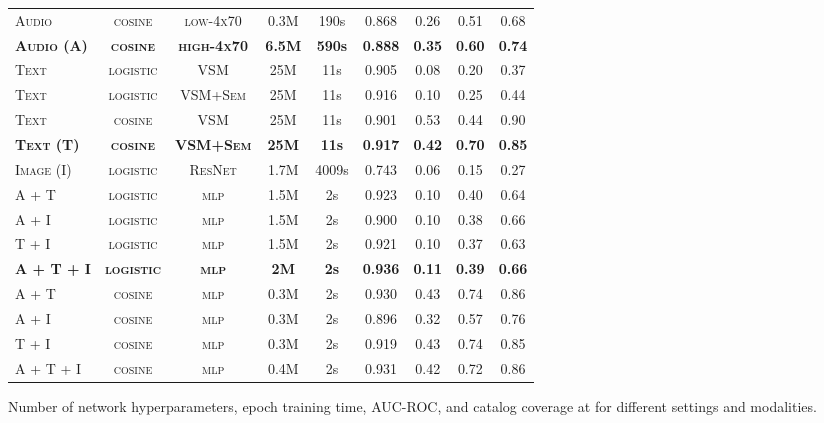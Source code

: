 \documentclass{article}
\begin{document}
\begin{table*}[ht]
\begin{threeparttable}
\begin{tabular}{lcccccccc}
\textsc{Audio} & \textsc{cosine} & \textsc{low-4x70}           & 0.3M           & 190s          & 0.868          & 0.26          & 0.51          & 0.68          \\
\textbf{\textsc{Audio (A)}} & \textbf{\textsc{cosine}} & \textbf{\textsc{high-4x70}} & \textbf{6.5M}  & \textbf{590s} & \textbf{0.888} & \textbf{0.35} & \textbf{0.60} & \textbf{0.74} \\
\midrule
\textsc{Text} & \textsc{logistic} & \textsc{VSM} & 25M & 11s & 0.905 & 0.08 & 0.20 & 0.37 \\
\textsc{Text} & \textsc{logistic} & \textsc{VSM+Sem} & 25M & 11s & 0.916 & 0.10 & 0.25 & 0.44 \\
\textsc{Text} & \textsc{cosine} & \textsc{VSM} & 25M & 11s & 0.901 & 0.53 & 0.44 & 0.90 \\
\textbf{\textsc{Text (T)}} & \textbf{\textsc{cosine}} & \textbf{\textsc{VSM+Sem}} & \textbf{25M} & \textbf{11s} & \textbf{0.917} & \textbf{0.42} & \textbf{0.70} & \textbf{0.85} \\
\midrule
\textsc{Image (I)} & \textsc{logistic} & \textsc{ResNet} & 1.7M & 4009s & 0.743 & 0.06 & 0.15 & 0.27 \\
\midrule
\textsc{A + T} & \textsc{logistic} & \textsc{mlp} & 1.5M & 2s & 0.923 & 0.10 & 0.40 & 0.64 \\
\textsc{A + I} & \textsc{logistic} & \textsc{mlp} & 1.5M & 2s & 0.900 & 0.10 & 0.38 & 0.66 \\
\textsc{T + I} & \textsc{logistic} & \textsc{mlp} & 1.5M & 2s & 0.921 & 0.10 & 0.37 & 0.63 \\
\textbf{\textsc{A + T + I}} & \textbf{\textsc{logistic}} & \textbf{\textsc{mlp}} & \textbf{2M} & \textbf{2s} & \textbf{0.936} & \textbf{0.11} & \textbf{0.39} & \textbf{0.66} \\
\textsc{A + T} & \textsc{cosine} & \textsc{mlp} & 0.3M & 2s & 0.930 & 0.43 & 0.74 & 0.86 \\
\textsc{A + I} & \textsc{cosine} & \textsc{mlp} & 0.3M & 2s & 0.896 & 0.32 & 0.57 & 0.76 \\
\textsc{T + I} & \textsc{cosine} & \textsc{mlp} & 0.3M & 2s & 0.919 & 0.43 & 0.74 & 0.85 \\
\textsc{A + T + I} & \textsc{cosine} & \textsc{mlp} & 0.4M & 2s & 0.931 & 0.42 & 0.72 & 0.86 \\
\bottomrule
\end{tabular}
    \begin{tablenotes}
      \small
      \item Number of network hyperparameters, epoch training time, AUC-ROC, and catalog coverage at  for different settings and modalities.
    \end{tablenotes}
   \end{threeparttable}
\end{table*}
\end{document}
